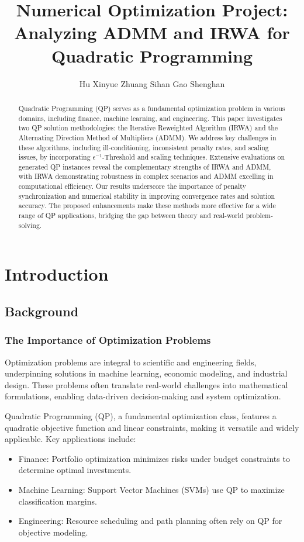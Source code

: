 \documentclass{article}
\title{Numerical Optimization Project:\\ Analyzing ADMM and IRWA for Quadratic Programming}
\author{%
  Hu Xinyue \And
  Zhuang Sihan \And
  Gao Shenghan
}
\begin{document}
\maketitle


\begin{abstract}
Quadratic Programming (QP) serves as a fundamental optimization problem in various domains, including finance, machine learning, and engineering. This paper investigates two QP solution methodologies: the Iterative Reweighted Algorithm (IRWA) and the Alternating Direction Method of Multipliers (ADMM). We address key challenges in these algorithms, including ill-conditioning, inconsistent penalty rates, and scaling issues, by incorporating \(\epsilon^{-1}\)-Threshold and scaling techniques. Extensive evaluations on generated QP instances reveal the complementary strengths of IRWA and ADMM, with IRWA demonstrating robustness in complex scenarios and ADMM excelling in computational efficiency. Our results underscore the importance of penalty synchronization and numerical stability in improving convergence rates and solution accuracy. The proposed enhancements make these methods more effective for a wide range of QP applications, bridging the gap between theory and real-world problem-solving.
\end{abstract}
\section{Introduction}
\subsection{Background}

\subsubsection{The Importance of Optimization Problems}
Optimization problems are integral to scientific and engineering fields, underpinning solutions in machine learning, economic modeling, and industrial design. These problems often translate real-world challenges into mathematical formulations, enabling data-driven decision-making and system optimization.

Quadratic Programming (QP), a fundamental optimization class, features a quadratic objective function and linear constraints, making it versatile and widely applicable. Key applications include:
\begin{itemize}
    \item \textup{Finance:} Portfolio optimization minimizes risks under budget constraints to determine optimal investments.
    \item \textup{Machine Learning:} Support Vector Machines (SVMs) use QP to maximize classification margins.
    \item \textup{Engineering:} Resource scheduling and path planning often rely on QP for objective modeling.
\end{itemize}
\end{document}
